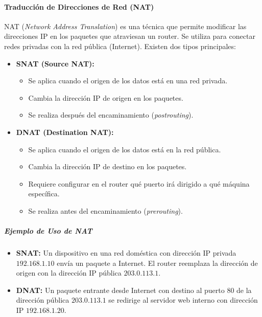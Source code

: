 \documentclass[a4paper,12pt]{article}
\begin{document}
\paragraph{Traducción de Direcciones de Red (NAT)}

NAT (\textit{Network Address Translation}) es una técnica que permite modificar las direcciones IP en los paquetes que atraviesan un router. Se utiliza para conectar redes privadas con la red pública (Internet). Existen dos tipos principales:

\begin{itemize}
    \item \textbf{SNAT (Source NAT):}
    \begin{itemize}
        \item Se aplica cuando el origen de los datos está en una red privada.
        \item Cambia la dirección IP de origen en los paquetes.
        \item Se realiza después del encaminamiento (\textit{postrouting}).
    \end{itemize}

    \item \textbf{DNAT (Destination NAT):}
    \begin{itemize}
        \item Se aplica cuando el origen de los datos está en la red pública.
        \item Cambia la dirección IP de destino en los paquetes.
        \item Requiere configurar en el router qué puerto irá dirigido a qué máquina específica.
        \item Se realiza antes del encaminamiento (\textit{prerouting}).
    \end{itemize}
\end{itemize}

\subparagraph{Ejemplo de Uso de NAT}
\begin{itemize}
    \item \textbf{SNAT:} Un dispositivo en una red doméstica con dirección IP privada \( 192.168.1.10 \) envía un paquete a Internet. El router reemplaza la dirección de origen con la dirección IP pública \( 203.0.113.1 \).
    \item \textbf{DNAT:} Un paquete entrante desde Internet con destino al puerto 80 de la dirección pública \( 203.0.113.1 \) se redirige al servidor web interno con dirección IP \( 192.168.1.20 \).
\end{itemize}
\end{document}
